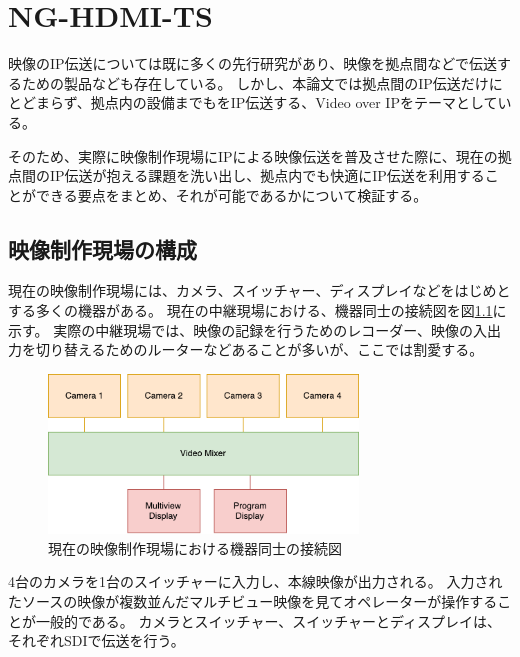 \chapter{NG-HDMI-TS}
\label{chap:network-transmission}

映像のIP伝送については既に多くの先行研究があり、映像を拠点間などで伝送するための製品なども存在している。
しかし、本論文では拠点間のIP伝送だけにとどまらず、拠点内の設備までもをIP伝送する、Video over IPをテーマとしている。

そのため、実際に映像制作現場にIPによる映像伝送を普及させた際に、現在の拠点間のIP伝送が抱える課題を洗い出し、拠点内でも快適にIP伝送を利用することができる要点をまとめ、それが可能であるかについて検証する。

\section{映像制作現場の構成}

現在の映像制作現場には、カメラ、スイッチャー、ディスプレイなどをはじめとする多くの機器がある。
現在の中継現場における、機器同士の接続図を図\ref{fig:broadcast-diagram-on-sdi}に示す。
実際の中継現場では、映像の記録を行うためのレコーダー、映像の入出力を切り替えるためのルーターなどあることが多いが、ここでは割愛する。

\begin{figure}[htbp]
  \begin{center}
    \includegraphics[bb=0 0 432 222,width=8.233cm]{img/broadcast-diagram-on-sdi.pdf}
  \end{center}
  \caption{現在の映像制作現場における機器同士の接続図}
  \label{fig:broadcast-diagram-on-sdi}
\end{figure}

4台のカメラを1台のスイッチャーに入力し、本線映像が出力される。
入力されたソースの映像が複数並んだマルチビュー映像を見てオペレーターが操作することが一般的である。
カメラとスイッチャー、スイッチャーとディスプレイは、それぞれSDIで伝送を行う。

